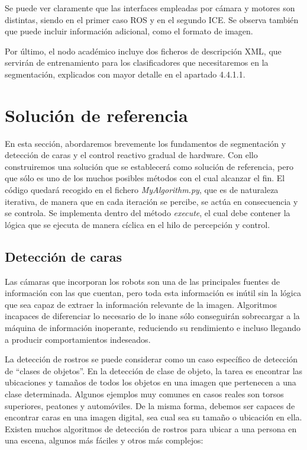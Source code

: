 Se puede ver claramente que las interfaces empleadas por cámara y motores son distintas, siendo en el primer caso ROS y en el segundo ICE. Se observa también que puede incluir información adicional, como el formato de imagen.

Por último, el nodo académico incluye dos ficheros de descripción XML, que servirán de entrenamiento para los clasificadores que necesitaremos en la segmentación, explicados con mayor detalle en el apartado 4.4.1.1. 

\section{Solución de referencia}
En esta sección, abordaremos brevemente los fundamentos de segmentación y detección de caras y el control reactivo gradual de hardware. Con ello construiremos una solución que se establecerá como solución de referencia, pero que sólo es uno de los muchos posibles métodos con el cual alcanzar el fin. El código quedará recogido en el fichero \textit{MyAlgorithm.py}, que es de naturaleza iterativa, de manera que en cada iteración se percibe, se actúa en consecuencia y se controla. Se implementa dentro del método \textit{execute}, el cual debe contener la lógica que se ejecuta de manera cíclica en el hilo de percepción y control.

\subsection{Detección de caras}
Las cámaras que incorporan los robots son una de las principales fuentes de información con las que cuentan, pero toda esta información es inútil sin la lógica que sea capaz de extraer la información relevante de la imagen. Algoritmos incapaces de diferenciar lo necesario de lo inane sólo conseguirán sobrecargar a la máquina de información inoperante, reduciendo su rendimiento e incluso llegando a producir comportamientos indeseados.

La detección de rostros se puede considerar como un caso específico de detección de “clases de objetos”. En la detección de clase de objeto, la tarea es encontrar las ubicaciones y tamaños de todos los objetos en una imagen que pertenecen a una clase determinada. Algunos ejemplos muy comunes en casos reales son torsos superiores, peatones y automóviles. De la misma forma, debemos ser capaces de encontrar caras en una imagen digital, sea cual sea su tamaño o ubicación en ella. Existen muchos algoritmos de detección de rostros para ubicar a una persona en una escena, algunos más fáciles y otros más complejos:

